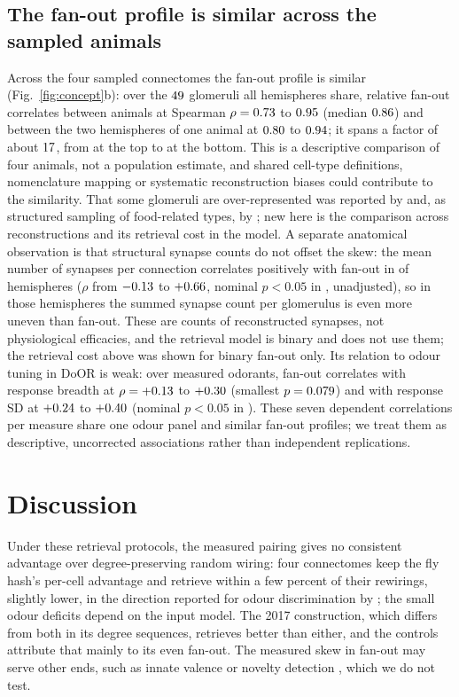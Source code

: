\documentclass[conference]{IEEEtran}
\begin{document}
\subsection{The fan-out profile is similar across the sampled animals}

Across the four sampled connectomes the fan-out profile is similar
(Fig.~\ref{fig:concept}b): over the $49$ glomeruli all hemispheres
share, relative fan-out correlates between animals at Spearman
$\rho=0.73$ to $0.95$ (median $0.86$) and between the
two hemispheres of one animal at $0.80$ to $0.94$; it spans a
factor of about $17$, from \FanTop{} at the top to \FanBottom{} at the
bottom. This is a descriptive comparison of four animals, not a population
estimate, and shared cell-type definitions, nomenclature mapping or systematic
reconstruction biases could contribute to the similarity. That some glomeruli
are over-represented was reported by \cite{caron2013} and, as structured
sampling of food-related types, by \cite{zheng2022}; new here is the comparison
across reconstructions and its retrieval cost in the model. A separate
anatomical observation is that structural synapse counts do not offset the
skew: the mean number of synapses per connection correlates positively with
fan-out in \FanWeightPos{} of \FanN{} hemispheres ($\rho$ from $-0.13$ to
$+0.66$, nominal $p<0.05$ in \FanWeightSig, unadjusted), so in those hemispheres the summed synapse count per glomerulus is even more uneven than fan-out. These are counts of reconstructed synapses, not physiological efficacies, and the retrieval model is binary and does not use them; the retrieval cost above was shown for binary fan-out only. Its relation to odour
tuning in DoOR is weak: over measured odorants, fan-out correlates with
response breadth at $\rho=+0.13$ to $+0.30$ (smallest
$p=0.079$) and with response SD at $+0.24$ to $+0.40$ (nominal
$p<0.05$ in \FanSdSig). These seven dependent correlations per measure share one odour panel and
similar fan-out profiles; we treat them as descriptive, uncorrected
associations rather than independent replications.

\section{Discussion}

Under these retrieval protocols, the measured pairing gives no consistent
advantage over degree-preserving random wiring: four connectomes keep the fly
hash's per-cell advantage and retrieve within a few percent of their rewirings,
slightly lower, in the direction reported for odour discrimination by
\cite{zheng2022}; the small odour deficits depend on the input model. The
2017 construction, which differs from both in its degree sequences, retrieves
better than either, and the controls attribute that mainly to its even fan-out.
The measured skew in fan-out may serve other ends, such as innate valence
\cite{zheng2022} or novelty detection \cite{dasgupta2018}, which we do not
test.
\end{document}

